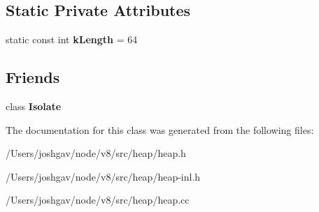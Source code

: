 \subsection*{Static Private Attributes}
\begin{DoxyCompactItemize}
\item 
static const int {\bfseries k\+Length} = 64\hypertarget{classv8_1_1internal_1_1_descriptor_lookup_cache_a9f8877e6fd3e0f997047e9fde75c6f29}{}\label{classv8_1_1internal_1_1_descriptor_lookup_cache_a9f8877e6fd3e0f997047e9fde75c6f29}

\end{DoxyCompactItemize}
\subsection*{Friends}
\begin{DoxyCompactItemize}
\item 
class {\bfseries Isolate}\hypertarget{classv8_1_1internal_1_1_descriptor_lookup_cache_aba4f0964bdacf2bbf62cf876e5d28d0a}{}\label{classv8_1_1internal_1_1_descriptor_lookup_cache_aba4f0964bdacf2bbf62cf876e5d28d0a}

\end{DoxyCompactItemize}


The documentation for this class was generated from the following files\+:\begin{DoxyCompactItemize}
\item 
/\+Users/joshgav/node/v8/src/heap/heap.\+h\item 
/\+Users/joshgav/node/v8/src/heap/heap-\/inl.\+h\item 
/\+Users/joshgav/node/v8/src/heap/heap.\+cc\end{DoxyCompactItemize}

